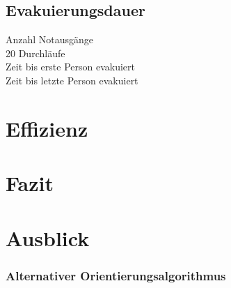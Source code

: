 \subsection{Evakuierungsdauer}

Anzahl Notausgänge\\
20 Durchläufe\\
Zeit bis erste Person evakuiert\\
Zeit bis letzte Person evakuiert\\


\section{Effizienz}

\section{Fazit}

\section{Ausblick}

\subsubsection{Alternativer Orientierungsalgorithmus}
\label{sec:bug-0}

